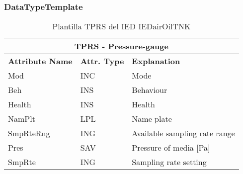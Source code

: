     \subsubsection{DataTypeTemplate}
    \begin{table}[H]
    \begin{center}
    \begin{tabular}{|l|l|p{8.5cm}|}
            \hline
            \multicolumn{3}{|c|}{\cellcolor[gray]{0.8} \textbf{ TPRS}  - Pressure-gauge} \\
            \hline
            \textbf{Attribute Name} & \textbf{Attr. Type} & \textbf{Explanation} \\
            \hline 
            Mod & INC & Mode \\
            \hline
            Beh & INS & Behaviour \\
            \hline
            Health & INS & Health \\
            \hline
            NamPlt & LPL & Name plate \\
            \hline
            SmpRteRng & ING & Available sampling rate range \\
            \hline
            Pres & SAV & Pressure of media [Pa] \\
            \hline
            SmpRte & ING & Sampling rate setting \\
            \hline
    \end{tabular}
    \caption{Plantilla TPRS del IED IEDairOilTNK}
    \label{table:lnTypeTPRS_gauge}
    \end{center}
    \end{table}
    
    
    